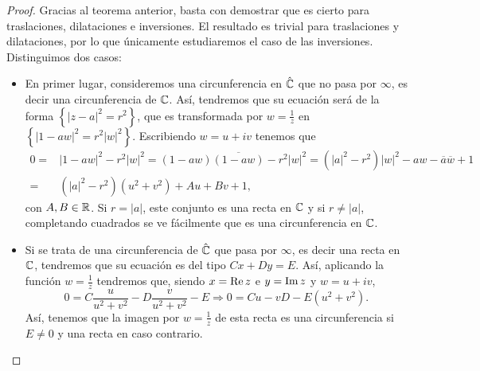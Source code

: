 \begin{proof}
	Gracias al teorema anterior, basta con demostrar que es cierto para traslaciones, dilataciones e inversiones. El resultado es trivial para traslaciones y dilataciones, por lo que únicamente estudiaremos el caso de las inversiones. Distinguimos dos casos:
	\begin{itemize}
		\item En primer lugar, consideremos una circunferencia en $\displaystyle \hat{\mathbb{C}} $ que no pasa por $\displaystyle \infty  $, es decir una circunferencia de $\displaystyle \mathbb{C} $. Así, tendremos que su ecuación será de la forma $\displaystyle \left\{ \left|z-a\right|^{2}=r^{2}\right\}  $, que es transformada por $\displaystyle w = \frac{1}{z} $ en $\displaystyle \left\{ \left|1-aw\right|^{2}=r^{2} \left|w\right|^{2}\right\}  $. Escribiendo $\displaystyle w = u + iv $ tenemos que 
		\[
		\begin{split}
			0 = & \left|1-aw\right|^{2}-r^{2} \left|w\right|^{2}=\left(1-aw\right)\overline{\left(1-aw\right)}-r^{2} \left|w\right|^{2} = \left( \left|a\right|^{2} - r^{2}\right) \left|w\right|^{2}-aw-\overline{a}\overline{w} + 1\\
			= & \left( \left|a\right|^{2}-r^{2}\right)\left(u^{2} + v^{2}\right) + Au + Bv + 1 ,
		\end{split}
		\]
		con $\displaystyle A,B \in \mathbb{R} $. Si $\displaystyle r = \left|a\right| $, este conjunto es una recta en $\displaystyle \mathbb{C} $ y si $\displaystyle r \neq \left|a\right| $, completando cuadrados se ve fácilmente que es una circunferencia en $\displaystyle \mathbb{C} $. 
	\item Si se trata de una circunferencia de $\displaystyle \hat{\mathbb{C}} $ que pasa por $\displaystyle \infty  $, es decir una recta en $\displaystyle \mathbb{C} $, tendremos que su ecuación es del tipo $\displaystyle Cx + Dy = E $. Así, aplicando la función $\displaystyle w = \frac{1}{z} $ tendremos que, siendo $\displaystyle x = \operatorname{Re} z $ e $\displaystyle y = \operatorname{Im} z $ y $\displaystyle w = u + iv $,
		\[0 = C \frac{u}{u^{2}+v^{2}} - D\frac{v}{u^{2}+v^{2}} - E \Rightarrow 0 = Cu - vD - E\left(u^{2} + v^{2}\right) .\]
	Así, tenemos que la imagen por $\displaystyle w = \frac{1}{z} $ de esta recta es una circunferencia si $\displaystyle E \neq 0 $ y una recta en caso contrario. 
	\end{itemize}
\end{proof}

